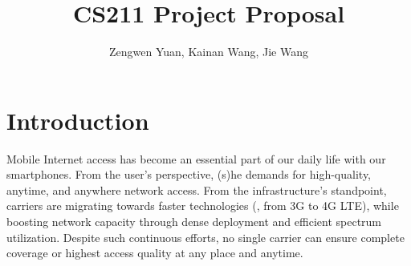 \documentclass{./template/sig-alternate-10pt-tight}
\begin{document}
\title{CS211 Project Proposal} 


 
\author{
Zengwen Yuan, Kainan Wang, Jie Wang}

\maketitle
\begin{sloppypar}

\maketitle


\section{Introduction}



Mobile Internet access has become an essential part of our daily life with our smartphones.
From the user's perspective, (s)he demands for high-quality, anytime, and anywhere network access. 
From the infrastructure's standpoint, carriers are migrating towards faster technologies (\eg, from 3G to 4G LTE), while boosting network capacity through 
dense deployment and efficient spectrum utilization. Despite such continuous efforts, no single carrier can ensure complete coverage or highest access quality at any place and anytime. 


\end{sloppypar}
\end{document}
